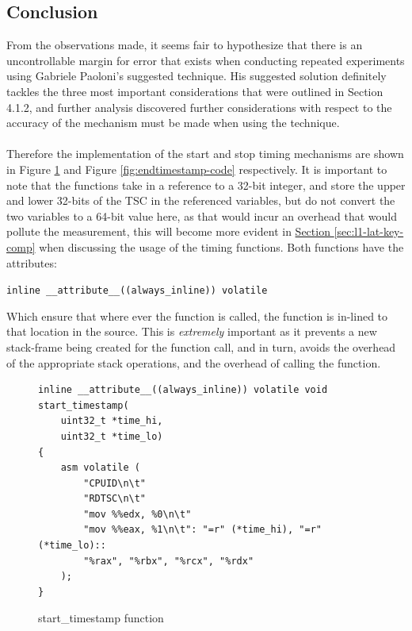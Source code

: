 \documentclass[bsc,frontabs,twoside,singlespacing,parskip,deptreport]{infthesis}     %
\begin{document}
\subsection{Conclusion}
From the observations made, it seems fair to hypothesize that there is an uncontrollable margin for error that exists when conducting repeated experiments using Gabriele Paoloni's suggested technique\cite{code_exec_times}. His suggested solution definitely tackles the three most important considerations that were outlined in Section 4.1.2, and further analysis discovered further considerations with respect to the accuracy of the mechanism must be made when using the technique. \\
\\
Therefore the implementation of the start and stop timing mechanisms are shown in Figure \ref{fig:starttimestamp-code} and Figure \ref{fig:endtimestamp-code} respectively. It is important to note that the functions take in a reference to a 32-bit integer, and store the upper and lower 32-bits of the TSC in the referenced variables, but do not convert the two variables to a 64-bit value here, as that would incur an overhead that would pollute the measurement, this will become more evident in \hyperref[sec:l1-lat-key-comp]{Section \ref{sec:l1-lat-key-comp}} when discussing the usage of the timing functions. Both functions have the attributes:
    
    \begin{center}
        \texttt{inline \_\_attribute\_\_((always\_inline)) volatile}
    \end{center}
Which ensure that where ever the function is called, the function is in-lined to that location in the source. This is \emph{extremely} important as it prevents a new stack-frame being created for the function call, and in turn, avoids the overhead of the appropriate stack operations, and the overhead of calling the function.

\begin{figure}[h!]
    \centering
    \begin{verbatim}
inline __attribute__((always_inline)) volatile void start_timestamp(
    uint32_t *time_hi,
    uint32_t *time_lo)
{
    asm volatile (
        "CPUID\n\t"
        "RDTSC\n\t"
        "mov %%edx, %0\n\t"
        "mov %%eax, %1\n\t": "=r" (*time_hi), "=r" (*time_lo)::
        "%rax", "%rbx", "%rcx", "%rdx"
    );
}
    \end{verbatim}
    \caption{start\_timestamp function}
    \label{fig:starttimestamp-code}
\end{figure}
\end{document}
